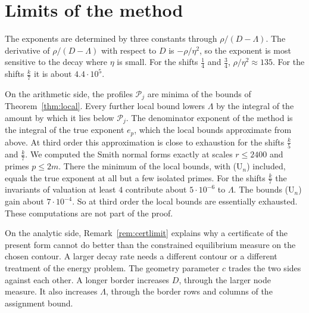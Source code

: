 \documentclass[11pt]{amsart}
\theoremstyle{definition}
\theoremstyle{remark}
\numberwithin{equation}{section}
\begin{document}
\section{Limits of the method}\label{sec:limits}

The exponents are determined by three constants through $\rho/(D-\Lambda)$. The derivative of $\rho/(D-\Lambda)$ with
respect to $D$ is $-\rho/\eta^2$, so the exponent is most sensitive to the decay where $\eta$ is small. For the shifts $\frac14$ and $\frac34$,
$\rho/\eta^2\approx135$. For the shifts $\frac k7$ it is about $4.4\cdot10^5$.

On the arithmetic side, the profiles $\mathcal P_j$ are minima of the bounds of Theorem~\ref{thm:local}. Every further
local bound lowers $\Lambda$ by the integral of the amount by which it lies below $\mathcal P_j$. The denominator exponent of
the method is the integral of the true exponent $e_p$, which the local bounds approximate from above. At third order this
approximation is close to exhaustion for the shifts $\frac k5$ and $\frac k7$. We computed the Smith normal forms exactly
at scales $r\le2400$ and primes $p\le2m$. There the minimum of the local bounds, with (U$_n$) included, equals the true
exponent at all but a few isolated primes. For the shifts $\frac k7$ the invariants of valuation at least $4$ contribute
about $5\cdot10^{-6}$ to $\Lambda$. The bounds (U$_n$) gain about $7\cdot10^{-4}$. So at third order the local bounds are
essentially exhausted. These computations are not part of the proof.

On the analytic side, Remark~\ref{rem:certlimit} explains why a certificate of the present form cannot do better than the
constrained equilibrium measure on the chosen contour. A larger decay rate needs a different contour or a different
treatment of the energy problem. The geometry parameter $c$ trades the two sides against each other. A longer border
increases $D$, through the larger node measure. It also increases $\Lambda$, through the border rows and columns of the
assignment bound.
\end{document}
